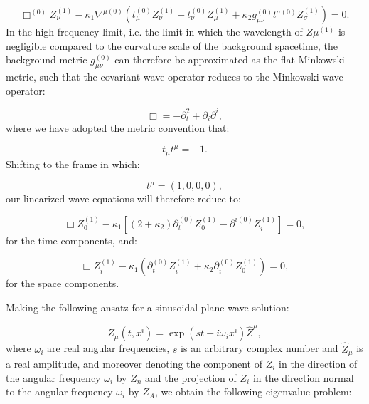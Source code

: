 \documentclass{article}
\begin{document}
\begin{equation}
\Box^{\left( 0 \right)} Z_{\nu}^{\left( 1 \right)} - \kappa_1 \nabla^{\mu \left( 0 \right)} \left( t_{\mu}^{\left( 0 \right)} Z_{\nu}^{\left( 1 \right)} + t_{\nu}^{\left( 0 \right)} Z_{\mu}^{\left( 1 \right)} + \kappa_2 g_{\mu \nu}^{\left( 0 \right)} t^{\sigma \left( 0 \right)} Z_{\sigma}^{\left( 1 \right)} \right) = 0.
\end{equation}
In the high-frequency limit, i.e. the limit in which the wavelength of ${Z{\mu}^{\left( 1 \right)}}$ is negligible compared to the curvature scale of the background spacetime, the background metric ${g_{\mu \nu}^{\left( 0 \right)}}$ can therefore be approximated as the flat Minkowski metric, such that the covariant wave operator reduces to the Minkowski wave operator:

\begin{equation}
\Box = - \partial_{t}^{2} + \partial_i \partial^i,
\end{equation}
where we have adopted the metric convention that:

\begin{equation}
t_{\mu} t^{\mu} = -1.
\end{equation}
Shifting to the frame in which:

\begin{equation}
t^{\mu} = \left( 1, 0, 0, 0 \right),
\end{equation}
our linearized wave equations will therefore reduce to:

\begin{equation}
\Box Z_{0}^{\left( 1 \right)} - \kappa_1 \left[ \left( 2 + \kappa_2 \right) \partial_{t}^{\left( 0 \right)} Z_{0}^{\left( 1 \right)} - \partial^{i \left( 0 \right)} Z_{i}^{\left( 1 \right)} \right] = 0,
\end{equation}
for the time components, and:

\begin{equation}
\Box Z_{i}^{\left( 1 \right)} - \kappa_1 \left( \partial_{t}^{\left( 0 \right)} Z_{i}^{\left( 1 \right)} + \kappa_2 \partial_{i}^{\left( 0 \right)} Z_{0}^{\left( 1 \right)} \right) = 0,
\end{equation}
for the space components.

Making the following ansatz for a sinusoidal plane-wave solution:

\begin{equation}
Z_{\mu} \left( t, x^{i} \right) = \exp \left( s t + i \omega_i x^i \right) \hat{Z}^{\mu},
\end{equation}
where ${\omega_i}$ are real angular frequencies, $s$ is an arbitrary complex number and ${\hat{Z}_{\mu}}$ is a real amplitude, and moreover denoting the component of ${Z_i}$ in the direction of the angular frequency ${\omega_i}$ by ${Z_n}$ and the projection of ${Z_i}$ in the direction normal to the angular frequency ${\omega_i}$ by ${Z_A}$, we obtain the following eigenvalue problem:
\end{document}
